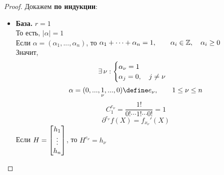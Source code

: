 \begin{proof}
	Докажем \textbf{по индукции}:
	\begin{itemize}
		\item \textbf{База.} $ r = 1 $ \\
		То есть, $ |\alpha| = 1 $ \\
		Если $ \alpha = (\alpha_1, ..., \alpha_n) $, то $ \alpha_1 + \dots + \alpha_n = 1, \qquad \alpha_i \in \mathbb{Z}, \quad \alpha_i \ge 0 $ \\
		Значит,
		$$ \exists\, \nu :
		\begin{cases}
			\alpha_\nu = 1 \\
			\alpha_j = 0, \quad j \ne \nu
		\end{cases} $$
		$$ \alpha = (0, ..., \underset\nu1, ..., 0) \define e_\nu, \qquad 1 \le \nu \le n $$
		$$ C_1^{e_\nu} = \frac{1!}{0! \cdots 1! \cdots 0!} = 1 $$
		$$ \partial^{e_\nu} f(X) = f_{x_\nu}'(X) $$
		Если $ H =  \begin{bmatrix} {h_1} \\ \vdots \\ {h_n} \end{bmatrix}  $, то $ H^{e_\nu} = h_\nu $


\end{itemize}
\end{proof}
